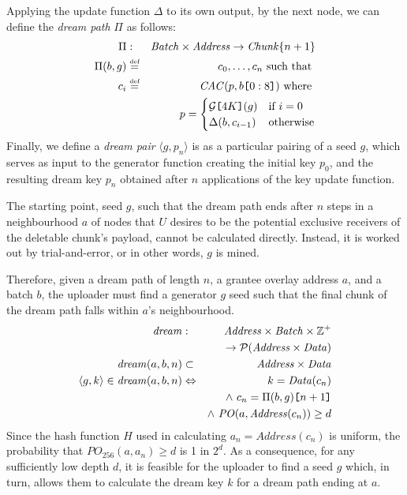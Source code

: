 \documentclass[singlecolumn]{acmart}
\newcommand\defeq{\overset{\textrm{\tiny  def}}{=}}
\newcommand{\idx}[1]{\texttt{[}\/#1\/\texttt{]}}
\begin{document}
Applying the update function $\Delta$ to its own output, by the next node, we can define the \emph{dream path} $\Pi$ as follows:
%
\begin{eqnarray}
\Pi&:&  \mathit{Batch}\times\mathit{Address}\to\mathit{Chunk}\{n+1\}\\
\Pi(b,g)&\defeq&c_0,\ldots, c_n\text{ such that }\\
c_i &\defeq&\mathit{CAC}(p,b\idx{0:8})\text{ where } \\ 
&& p=\begin{cases}
\mathcal{G}\idx{4K}(g)&\text{if }i=0\\   
{\Delta}(b,c_{i-1})&\text{otherwise}             
\end{cases}
\end{eqnarray}
%
Finally, we define a \emph{dream pair} $\langle g,p_n\rangle$ is as a particular pairing of a seed $g$, which serves as input to the generator function creating the initial key $p_0$, and the resulting dream key $p_n$ obtained after $n$ applications of the key update function.

The starting point, seed $g$, such that the dream path ends after $n$ steps in a neighbourhood $a$ of nodes that $U$ desires to be the potential exclusive receivers of the deletable chunk's payload, cannot be calculated directly. Instead, it is worked out by trial-and-error, or in other words, $g$ is mined. 

Therefore, given a dream path of length $n$, a grantee overlay address $a$, and a batch $b$, the uploader must find a generator $g$ seed such that the final chunk of the dream path falls within $a$'s neighbourhood.
%
\begin{eqnarray}
\mathit{dream}&:&\mathit{Address}\times\mathit{Batch}\times\mathbb{Z}^{+} \\
&& \to\mathcal{P}(\mathit{Address}\times\mathit{Data})\\
\mathit{dream}(a,b,n) &\subset &\mathit{Address}\times\mathit{Data}\\
\langle g, k\rangle \in \mathit{dream}(a,b,n) 
&\Leftrightarrow
& k=\mathit{Data}(c_n)\\
&&\land\ c_n=\Pi(b,g)\idx{n+1}\\
&& \land\ \mathit{PO}(a,\mathit{Address}(c_n))\geq d
\end{eqnarray}
%
Since the hash function $\mathit{H}$ used in calculating $a_n=\mathit{Address}(c_n)$ is uniform, the probability that $\mathit{PO_{256}}(a,a_n)\geq d$ is 1 in $2^{d}$. As a consequence, for any sufficiently low depth $d$, it is feasible for the uploader to find a seed $g$ which, in turn, allows them to calculate the dream key $k$ for a dream path ending at $a$.%
\end{document}
